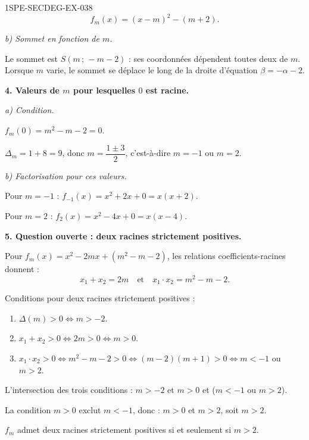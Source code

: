 \begin{corrige}{1SPE-SECDEG-EX-038}
\[f_m(x) = (x - m)^2 - (m + 2).\]

\textit{b) Sommet en fonction de $m$.}

Le sommet est $S(m\,;\,-m-2)$ : ses coordonnées dépendent toutes deux de $m$. Lorsque $m$ varie, le sommet se déplace le long de la droite d'équation $\beta = -\alpha - 2$.

\medskip
\textbf{4. Valeurs de $m$ pour lesquelles $0$ est racine.}

\textit{a) Condition.}


$f_m(0) = m^2 - m - 2 = 0$.

$\Delta_m = 1 + 8 = 9$, donc $m = \dfrac{1 \pm 3}{2}$, c'est-à-dire $m = -1$ ou $m = 2$.

\textit{b) Factorisation pour ces valeurs.}

Pour $m = -1$ : $f_{-1}(x) = x^2 + 2x + 0 = x(x + 2)$.

Pour $m = 2$ : $f_2(x) = x^2 - 4x + 0 = x(x - 4)$.

\medskip
\textbf{5. Question ouverte : deux racines strictement positives.}


Pour $f_m(x) = x^2 - 2mx + (m^2 - m - 2)$, les relations coefficients-racines donnent :
\[x_1 + x_2 = 2m \quad \text{et} \quad x_1 \cdot x_2 = m^2 - m - 2.\]

Conditions pour deux racines strictement positives :
\begin{enumerate}
  \item $\Delta(m) > 0 \iff m > -2$.
  \item $x_1 + x_2 > 0 \iff 2m > 0 \iff m > 0$.
  \item $x_1 \cdot x_2 > 0 \iff m^2 - m - 2 > 0 \iff (m-2)(m+1) > 0 \iff m < -1$ ou $m > 2$.
\end{enumerate}

L'intersection des trois conditions : $m > -2$ et $m > 0$ et ($m < -1$ ou $m > 2$).

La condition $m > 0$ exclut $m < -1$, donc : $m > 0$ et $m > 2$, soit $m > 2$.

$f_m$ admet deux racines strictement positives si et seulement si $m > 2$.

\end{corrige}
